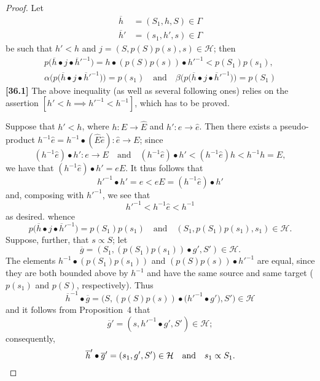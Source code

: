 \documentclass[a4paper,fleqn]{article}
\theoremstyle{plain}
\theoremstyle{definition}
\newenvironment{longcomm}[1]
  {\noindent\textbf{[#1]}\rmfamily}
  {}
\newcommand{\oldpage}[1]{{\marginpar{\footnotesize$\bigg\vert$\,\,\,\,\textit{p.~#1}}}}
\newcommand{\textand}{\quad\text{and}\quad}
\newcommand{\HH}{\mathcal{H}}
\newcommand{\subs}{\mathrel{\propto}}
\begin{document}
\begin{proof}
  \oldpage{364}
  Let
  \[
    \begin{aligned}
      \overline{h}
      &= (S_1,h,S)\in\Gamma
    \\\overline{h}'
      &= (s_1,h',s)\in\Gamma
    \end{aligned}
  \]
  be such that $h'<h$ and $j=(S,p(S)p(s),s)\in\HH$;
  then
  \[
    \begin{gathered}
      p\big(\overline{h}\bullet j\bullet \overline{h}'^{-1}\big)
      = h\bullet(p(S)p(s))\bullet h'^{-1}
      < p(S_1)p(s_1),
    \\\alpha\big(p\big(\overline{h}\bullet j\bullet\overline{h}'^{-1}\big)\big)
      = p(s_1)
      \textand
      \beta\big(p\big(\overline{h}\bullet j\bullet\overline{h}'^{-1}\big)\big)
      = p(S_1)
    \end{gathered}
  \]
  \begin{longcomm}{36.1}
    The above inequality (as well as several following ones) relies on the assertion $[h'<h\implies {h'}^{-1}<h^{-1}]$, which has to be proved.

    Suppose that $h'<h$, where $h\colon E\to\hat{E}$ and $h'\colon e\to\hat{e}$.
    Then there exists a pseudo-product $h^{-1}\hat{e}=h^{-1}\bullet(\hat{E}\hat{e})\colon\hat{e}\to E$;
    since
    \[
      (h^{-1}\hat{e})\bullet h'\colon e\to E
      \textand
      (h^{-1}\hat{e})\bullet h'
      < (h^{-1}\hat{e})h
      < h^{-1}h
      = E,
    \]
    we have that $(h^{-1}\hat{e})\bullet h'=eE$.
    It thus follows that
    \[
      {h'}^{-1}\bullet h'
      = e
      < eE
      = (h^{-1}\hat{e})\bullet h'
    \]
    and, composing with ${h'}^{-1}$, we see that
    \[
      {h'}^{-1}
      < h^{-1}\hat{e}
      < h^{-1}
    \]
    as desired.
  \end{longcomm}
  whence
  \[
    p\big(\overline{h}\bullet j\bullet\overline{h}'^{-1}\big)
    = p(S_1)p(s_1)
    \textand
    (S_1,p(S_1)p(s_1),s_1)
    \in\HH.
  \]
  Suppose, further, that $s\subs S$;
  let
  \[
    \overline{g}
    = (S_1,(p(S_1)p(s_1))\bullet g',S')
    \in\HH.
  \]
  The elements $h^{-1}\bullet(p(S_1)p(s_1))$ and $(p(S)p(s))\bullet h'^{-1}$ are equal, since they are both bounded above by $h^{-1}$ and have the same source and same target ($p(s_1)$ and $p(S)$, respectively).
  Thus
  \[
    \overline{h}^{-1}\bullet\overline{g}
    = \big(S,(p(S)p(s))\bullet\big( h'^{-1}\bullet g'\big),S'\big)
    \in\HH
  \]
  and it follows from Proposition~4 that
  \[
    \overline{g}'
    = (s,h'^{-1}\bullet g',S')
    \in\HH;
  \]
  consequently,
  \[
    \overline{h}'\bullet\overline{g}'
    = (s_1,g',S')
    \in\HH
    \textand
    s_1\subs S_1.
    \qedhere
  \]
\end{proof}
\end{document}

